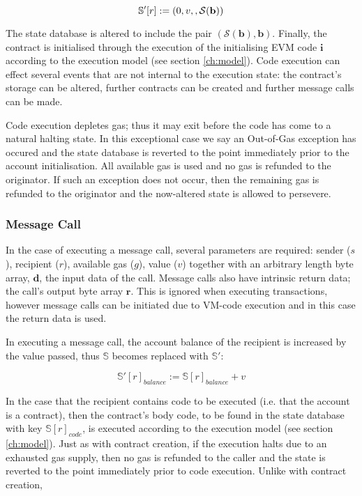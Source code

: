 \documentclass[9pt,oneside]{amsart}
\begin{document}
\begin{multicols}{2}
\begin{equation}
\mathbb{S}'[r] := ( 0, v, \empty, \mathcal{S}(\mathbf{b}) )
\end{equation}

The state database is altered to include the pair $(\mathcal{S}(\mathbf{b}), \mathbf{b})$. Finally, the contract is initialised through the execution of the initialising EVM code $\mathbf{i}$ according to the execution model (see section \ref{ch:model}). Code execution can effect several events that are not internal to the execution state: the contract's storage can be altered, further contracts can be created and further message calls can be made.

Code execution depletes gas; thus it may exit before the code has come to a natural halting state. In this exceptional case we say an Out-of-Gas exception has occured and the state database is reverted to the point immediately prior to the account initialisation. All available gas is used and no gas is refunded to the originator. If such an exception does not occur, then the remaining gas is refunded to the originator and the now-altered state is allowed to persevere.

\subsubsection{Message Call} \label{ch:call}

In the case of executing a message call, several parameters are required: sender ($s$), recipient ($r$), available gas ($g$), value ($v$) together with an arbitrary length byte array, $\mathbf{d}$, the input data of the call. Message calls also have intrinsic return data; the call's output byte array $\mathbf{r}$. This is ignored when executing transactions, however message calls can be initiated due to VM-code execution and in this case the return data is used.

In executing a message call, the account balance of the recipient is increased by the value passed, thus $\mathbb{S}$ becomes replaced with $\mathbb{S}'$:

\begin{equation}
\mathbb{S}'[r]_{balance} := \mathbb{S}[r]_{balance} + v
\end{equation}

In the case that the recipient contains code to be executed (i.e. that the account is a contract), then the contract's body code, to be found in the state database with key $\mathbb{S}[r]_{code}$, is executed according to the execution model (see section \ref{ch:model}). Just as with contract creation, if the execution halts due to an exhausted gas supply, then no gas is refunded to the caller and the state is reverted to the point immediately prior to code execution. Unlike with contract creation, 


\end{multicols}
\end{document}
